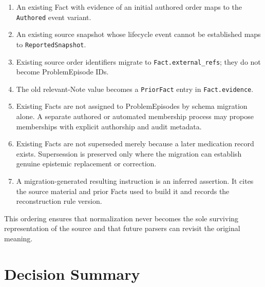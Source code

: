 \documentclass[11pt]{article}
\newcommand{\field}[1]{\texttt{#1}}
\begin{document}
\begin{enumerate}
  \item An existing Fact with evidence of an initial authored order maps to
    the \field{Authored} event variant.
  \item An existing source snapshot whose lifecycle event cannot be
    established maps to \field{ReportedSnapshot}.
  \item Existing source order identifiers migrate to
    \field{Fact.external\_refs}; they do not become ProblemEpisode IDs.
  \item The old relevant-Note value becomes a \field{PriorFact} entry in
    \field{Fact.evidence}.
  \item Existing Facts are not assigned to ProblemEpisodes by schema
    migration alone. A separate authored or automated membership process may
    propose memberships with explicit authorship and audit metadata.
  \item Existing Facts are not superseded merely because a later medication
    record exists. Supersession is preserved only where the migration can
    establish genuine epistemic replacement or correction.
  \item A migration-generated resulting instruction is an inferred assertion.
    It cites the source material and prior Facts used to build it and records
    the reconstruction rule version.
\end{enumerate}

This ordering ensures that normalization never becomes the sole surviving
representation of the source and that future parsers can revisit the original
meaning.

\section{Decision Summary}
\end{document}
